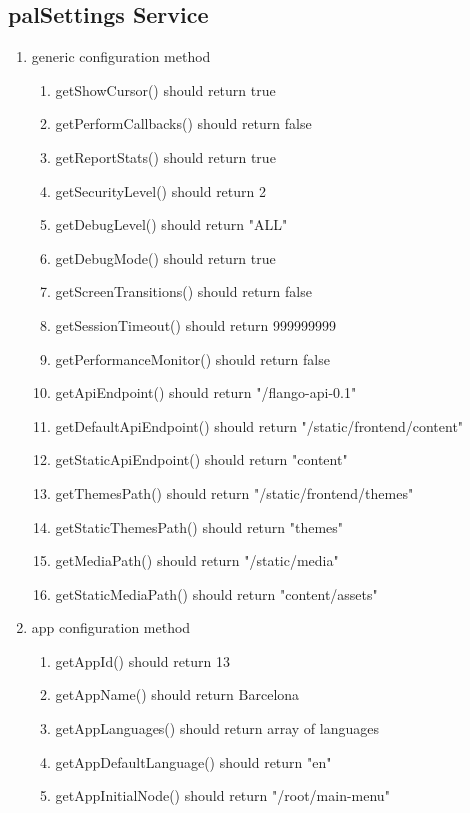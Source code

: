 \begin{singlespace}
\section*{palSettings Service}
\begin{enumerate}
\item     generic configuration method
\begin{enumerate}
\item         getShowCursor() should return true
\item         getPerformCallbacks() should return false
\item         getReportStats() should return true
\item         getSecurityLevel() should return 2
\item         getDebugLevel() should return "ALL"
\item         getDebugMode() should return true
\item         getScreenTransitions() should return false
\item         getSessionTimeout() should return 999999999
\item         getPerformanceMonitor() should return false
\item         getApiEndpoint() should return "/flango-api-0.1"
\item         getDefaultApiEndpoint() should return "/static/frontend/content"
\item         getStaticApiEndpoint() should return "content"
\item         getThemesPath() should return "/static/frontend/themes"
\item         getStaticThemesPath() should return "themes"
\item         getMediaPath() should return "/static/media"
\item         getStaticMediaPath() should return "content/assets"
\end{enumerate}
\item     app configuration method
\begin{enumerate}
\item         getAppId() should return 13
\item         getAppName() should return Barcelona
\item         getAppLanguages() should return array of languages
\item         getAppDefaultLanguage() should return "en"
\item         getAppInitialNode() should return "/root/main-menu"

\end{enumerate}
\end{enumerate}
\end{singlespace}
